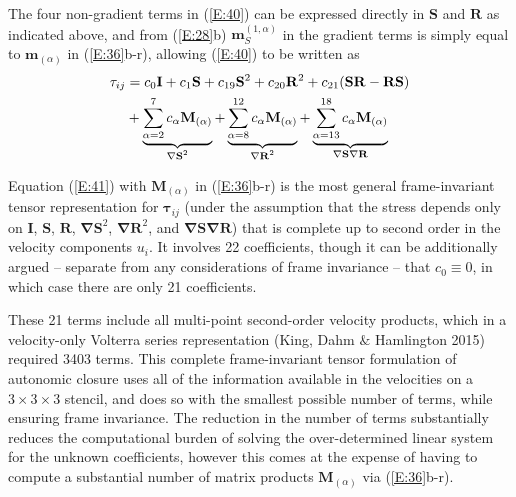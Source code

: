 The four non-gradient terms in (\ref{E:40}) can be expressed directly in $\mathbf{S}$ and $\mathbf{R}$ as indicated above, and from (\ref{E:28}b)  $\mathbf{m}^{(1,\alpha)}_{S}$ in the gradient terms is simply equal to $\mathbf{m}_{(\alpha)}$ in (\ref{E:36}b-r), allowing (\ref{E:40}) to be written as
%
\begin{align}
\label{E:42}
	\mathbf{\tau}_{ij} &=  c_{0} \mathbf{I}
	+ c_{1} \mathbf{S}
	+ c_{19} \mathbf{S}^2
	+ c_{20} \mathbf{R}^2
	+ c_{21} (\mathbf{SR-RS}) \notag \\
	&+ \underbrace{
				\sum_{\alpha=2}^{7} c_{\alpha} \mathbf{M}_{(\alpha)}
				 } %
				_{\text{ $\mathbf{\nabla S}^2$ }}
	+ \underbrace{
				\sum_{\alpha=8}^{12} c_{\alpha} \mathbf{M}_{(\alpha)}
				 } %
				_{\text{ $\mathbf{\nabla R}^2$ }}
	+ \underbrace{
				\sum_{\alpha=13}^{18} c_{\alpha} \mathbf{M}_{(\alpha)}
				 } %
				_{\text{ $\mathbf{\nabla S \nabla R}$ }}
\end{align}
%
%   

Equation (\ref{E:41}) with $\mathbf{M}_{(\alpha)}$  in (\ref{E:36}b-r) is the most general frame-invariant tensor representation for $\mathbf{\tau}_{ij}$  (under the assumption that the stress depends only on $\mathbf{I}$, $\mathbf{S}$, $\mathbf{R}$, $\mathbf{\nabla S}^{2}$, $\mathbf{\nabla R}^{2}$, and $\mathbf{\nabla S \nabla R}$) that is complete up to second order in the velocity components  $u_i$.  It involves 22 coefficients, though it can be additionally argued – separate from any considerations of frame invariance – that $c_0 \equiv 0$, in which case there are only 21 coefficients. 

These 21 terms include all multi-point second-order velocity products, which in a velocity-only Volterra series representation (King, Dahm $\&$ Hamlington 2015) required 3403 terms. This complete frame-invariant tensor formulation of autonomic closure uses all of the information available in the velocities on a $3 \times 3 \times 3$  stencil, and does so with the smallest possible number of terms, while ensuring frame invariance. The reduction in the number of terms substantially reduces the computational burden of solving the over-determined linear system for the unknown coefficients, however this comes at the expense of having to compute a substantial number of matrix products $\mathbf{M}_{(\alpha)}$  via (\ref{E:36}b-r).

